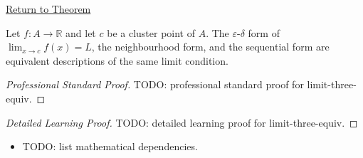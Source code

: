\newpage
{}
\label{prf:limit-three-equiv}

\begin{remark*}[Return]
\hyperref[cor:limit-three-equiv]{Return to Theorem}
\end{remark*}

\begin{corollary*}
Let $f : A \to \mathbb{R}$ and let $c$ be a cluster point of $A$.
The $\varepsilon$-$\delta$ form of $\lim_{x\to c}f(x)=L$, the
neighbourhood form, and the sequential form are equivalent descriptions
of the same limit condition.

\smallskip\noindent
\end{corollary*}

\begin{proof}[Professional Standard Proof]
\LRAProofBodyStart
TODO: professional standard proof for limit-three-equiv.
\end{proof}

\begin{proof}[Detailed Learning Proof]
\LRAProofBodyStart
TODO: detailed learning proof for limit-three-equiv.
\end{proof}

\begin{remark*}
\end{remark*}

\begin{dependencies}
\begin{itemize}
  \item TODO: list mathematical dependencies.
\end{itemize}
\end{dependencies}

\clearpage
